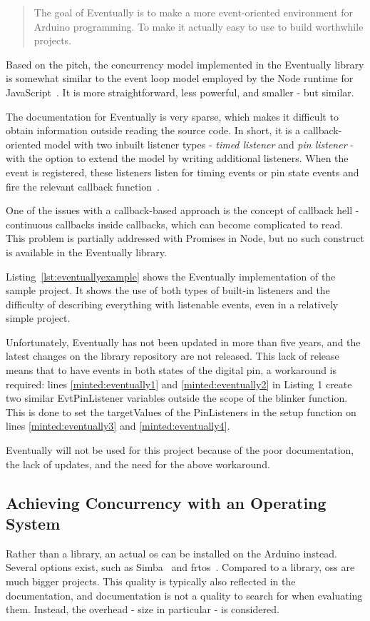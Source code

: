 \blockcquote{bartlettEventually2022Bartlett}{The goal of Eventually is to make a more event-oriented environment for Arduino programming. To make it actually easy to use to build worthwhile projects.}

Based on the pitch, the concurrency model implemented in the Eventually library is somewhat similar to the event loop model employed by the Node runtime for JavaScript~\cite{NodeJSdocs}. It is more straightforward, less powerful, and smaller - but similar.

The documentation for Eventually is very sparse, which makes it difficult to obtain information outside reading the source code. In short, it is a callback-oriented model with two inbuilt listener types - \textit{timed listener} and \textit{pin listener} - with the option to extend the model by writing additional listeners. When the event is registered, these listeners listen for timing events or pin state events and fire the relevant callback function~\cite{bartlettEventually2022Bartlett}.

One of the issues with a callback-based approach is the concept of callback hell - continuous callbacks inside callbacks, which can become complicated to read. This problem is partially addressed with Promises in Node, but no such construct is available in the Eventually library.

Listing~\ref{lst:eventuallyexample} shows the Eventually implementation of the sample project. It shows the use of both types of built-in listeners and the difficulty of describing everything with listenable events, even in a relatively simple project.

Unfortunately, Eventually has not been updated in more than five years, and the latest changes on the library repository are not released. This lack of release means that to have events in both states of the digital pin, a workaround is required: lines \ref{minted:eventually1} and \ref{minted:eventually2} in Listing 1 create two similar EvtPinListener variables outside the scope of the blinker function. This is done to set the targetValues of the PinListeners in the setup function on lines \ref{minted:eventually3} and \ref{minted:eventually4}.

Eventually will not be used for this project because of the poor documentation, the lack of updates, and the need for the above workaround.


\subsection{Achieving Concurrency with an Operating System}\label{subsec:arduinoos}
Rather than a library, an actual \gls{os} can be installed on the Arduino instead. Several options exist, such as Simba~\cite{SimbaOS} and \gls{frtos}~\cite{AboutRTOS}. Compared to a library, \glspl{os} are much bigger projects. This quality is typically also reflected in the documentation, and documentation is not a quality to search for when evaluating them. Instead, the overhead - size in particular - is considered.

